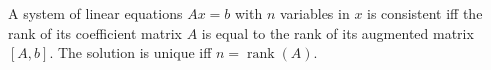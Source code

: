 A system of linear equations $A x = b$ with $n$ variables in $x$ is consistent iff the rank of its coefficient matrix $A$ is equal to the rank of its augmented matrix $[A,b]$. The solution is unique iff $n = \operatorname{rank}(A)$.
